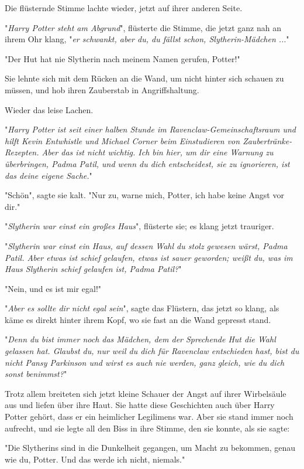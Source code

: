 {Die flüsternde Stimme lachte wieder, jetzt auf ihrer anderen Seite.

"\emph{Harry Potter steht am Abgrund}", flüsterte die Stimme, die jetzt ganz nah an ihrem Ohr klang, "\emph{er schwankt, aber du, du fällst schon, Slytherin-Mädchen ..}."

"Der Hut hat nie Slytherin nach meinem Namen gerufen, Potter!"

Sie lehnte sich mit dem Rücken an die Wand, um nicht hinter sich schauen zu müssen, und hob ihren Zauberstab in Angriffshaltung.

Wieder das leise Lachen.

"\emph{Harry Potter ist seit einer halben Stunde im Ravenclaw-Gemeinschaftsraum und hilft Kevin Entwhistle und Michael Corner beim Einstudieren von Zaubertränke-Rezepten. Aber das ist nicht wichtig. Ich bin hier, um dir eine Warnung zu überbringen, Padma Patil, und wenn du dich entscheidest, sie zu ignorieren, ist das deine eigene Sache.}"

"Schön", sagte sie kalt. "Nur zu, warne mich, Potter, ich habe keine Angst vor dir."

"\emph{Slytherin war einst ein großes Haus}", flüsterte sie; es klang jetzt trauriger.

"\emph{Slytherin war einst ein Haus, auf dessen Wahl du stolz gewesen wärst, Padma Patil. Aber etwas ist schief gelaufen, etwas ist sauer geworden; weißt du, was im Haus Slytherin schief gelaufen ist, Padma Patil?}"

"Nein, und es ist mir egal!"

"\emph{Aber es sollte dir nicht egal sein}", sagte das Flüstern, das jetzt so klang, als käme es direkt hinter ihrem Kopf, wo sie fast an die Wand gepresst stand.

"\emph{Denn du bist immer noch das Mädchen, dem der Sprechende Hut die Wahl gelassen hat. Glaubst du, nur weil du dich für Ravenclaw entschieden hast, bist du nicht Pansy Parkinson und wirst es auch nie werden, ganz gleich, wie du dich sonst benimmst?}"

Trotz allem breiteten sich jetzt kleine Schauer der Angst auf ihrer Wirbelsäule aus und liefen über ihre Haut. Sie hatte diese Geschichten auch über Harry Potter gehört, dass er ein heimlicher Legilimens war. Aber sie stand immer noch aufrecht, und sie legte all den Biss in ihre Stimme, den sie konnte, als sie sagte:

"Die Slytherins sind in die Dunkelheit gegangen, um Macht zu bekommen, genau wie du, Potter. Und das werde ich nicht, niemals."

}
